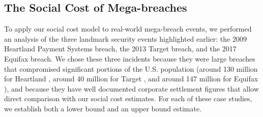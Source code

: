 



\subsection{The Social Cost of Mega-breaches}
\label{sec:breach_social_cost}
To apply our social cost model to real-world mega-breach events, we performed an analysis of the three landmark security events highlighted earlier: the 2009 Heartland Payment Systems breach, the 2013 Target breach, and the 2017 Equifax breach. We chose these three incidents because they were large breaches that compromised significant portions of the U.S. population (around 130 million for Heartland \cite{USCourts_Heartland}, around 40 million for Target \cite{Target_Breach}, and around 147 million for Equifax \cite{House_Equifax}), and because they have well documented corporate settlement figures that allow direct comparison with our social cost estimates. For each of these case studies, we establish both a lower bound and an upper bound estimate. 

